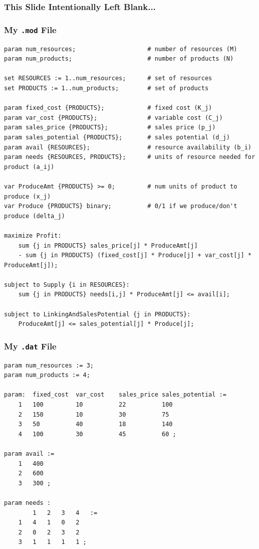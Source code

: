 \begin{frame}
	\frametitle{This Slide Intentionally Left Blank...}
\end{frame}

\begin{frame}[fragile]

	\frametitle{My {\tt .mod} File}
	
	
\begin{lstlisting}
param num_resources;					# number of resources (M)
param num_products;						# number of products (N)

set RESOURCES := 1..num_resources;		# set of resources
set PRODUCTS := 1..num_products;		# set of products

param fixed_cost {PRODUCTS};			# fixed cost (K_j)
param var_cost {PRODUCTS};				# variable cost (C_j)
param sales_price {PRODUCTS};			# sales price (p_j)
param sales_potential {PRODUCTS};		# sales potential (d_j)
param avail {RESOURCES};				# resource availability (b_i)
param needs {RESOURCES, PRODUCTS};		# units of resource needed for product (a_ij)

var ProduceAmt {PRODUCTS} >= 0;			# num units of product to produce (x_j)
var Produce {PRODUCTS} binary;			# 0/1 if we produce/don't produce (delta_j)

maximize Profit:
	sum {j in PRODUCTS} sales_price[j] * ProduceAmt[j] 
	- sum {j in PRODUCTS} (fixed_cost[j] * Produce[j] + var_cost[j] * ProduceAmt[j]);
	
subject to Supply {i in RESOURCES}:
	sum {j in PRODUCTS} needs[i,j] * ProduceAmt[j] <= avail[i];
	
subject to LinkingAndSalesPotential {j in PRODUCTS}:
	ProduceAmt[j] <= sales_potential[j] * Produce[j];
\end{lstlisting}

\end{frame}

\begin{frame}[fragile]

	\frametitle{My {\tt .dat} File}
	
	
\begin{lstlisting}
param num_resources := 3;
param num_products := 4;

param:	fixed_cost	var_cost	sales_price	sales_potential :=
	1	100			10			22			100
	2	150			10			30			75
	3	50			40			18			140
	4	100			30			45			60 ;
	
param avail :=
	1	400
	2	600
	3	300 ;
	
param needs :
		1	2	3	4	:=
	1	4	1	0	2
	2	0	2	3	2
	3	1	1	1	1 ;
\end{lstlisting}

\end{frame}


